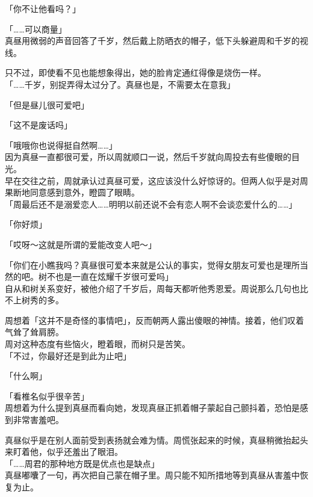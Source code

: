 「你不让他看吗？」

「……可以商量」\\

真昼用微弱的声音回答了千岁，然后戴上防晒衣的帽子，低下头躲避周和千岁的视线。

只不过，即使看不见也能想象得出，她的脸肯定通红得像是烧伤一样。\\

「……千岁，别捉弄得太过分了。真昼也是，不需要太在意我」

「但是昼儿很可爱吧」

「这不是废话吗」

「哦哦你也说得挺自然啊……」\\

因为真昼一直都很可爱，所以周就顺口一说，然后千岁就向周投去有些傻眼的目光。\\

早在交往之前，周就承认过真昼可爱，这应该没什么好惊讶的。但两人似乎是对周果断地同意感到意外，瞪圆了眼睛。\\

「周最后还不是溺爱恋人……明明以前还说不会有恋人啊不会谈恋爱什么的……」

「你好烦」

「哎呀～这就是所谓的爱能改变人吧～」

「你们在小瞧我吗？真昼很可爱本来就是公认的事实，觉得女朋友可爱也是理所当然的吧。树不也是一直在炫耀千岁很可爱吗」\\

自从和树关系变好，被他介绍了千岁后，周每天都听他秀恩爱。周说那么几句也比不上树秀的多。

周想着「这并不是奇怪的事情吧」，反而朝两人露出傻眼的神情。接着，他们叹着气耸了耸肩膀。\\

周对这种态度有些恼火，瞪着眼，而树只是苦笑。\\

「不过，你最好还是到此为止吧」

「什么啊」

「看椎名似乎很辛苦」\\

周想着为什么提到真昼而看向她，发现真昼正抓着帽子蒙起自己颤抖着，恐怕是感到非常害羞吧。

真昼似乎是在别人面前受到表扬就会难为情。周慌张起来的时候，真昼稍微抬起头来盯着他，似乎还羞出了眼泪。\\

「……周君的那种地方既是优点也是缺点」\\

真昼嘟囔了一句，再次把自己蒙在帽子里。周只能不知所措地等到真昼从害羞中恢复为止。
